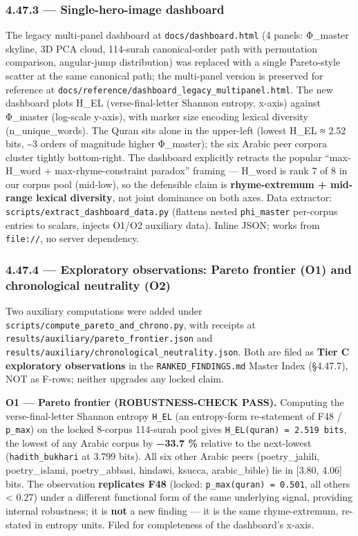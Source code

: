 \documentclass[
]{article}
\begin{document}
\subsubsection{4.47.3 --- Single-hero-image
dashboard}\label{single-hero-image-dashboard}

The legacy multi-panel dashboard at \texttt{docs/dashboard.html} (4
panels: Φ\_master skyline, 3D PCA cloud, 114-surah canonical-order path
with permutation comparison, angular-jump distribution) was replaced
with a single Pareto-style scatter at the same canonical path; the
multi-panel version is preserved for reference at
\texttt{docs/reference/dashboard\_legacy\_multipanel.html}. The new
dashboard plots H\_EL (verse-final-letter Shannon entropy, x-axis)
against Φ\_master (log-scale y-axis), with marker size encoding lexical
diversity (n\_unique\_words). The Quran sits alone in the upper-left
(lowest H\_EL ≈ 2.52 bits, \textasciitilde3 orders of magnitude higher
Φ\_master); the six Arabic peer corpora cluster tightly bottom-right.
The dashboard explicitly retracts the popular ``max-H\_word +
max-rhyme-constraint paradox'' framing --- H\_word is rank 7 of 8 in our
corpus pool (mid-low), so the defensible claim is \textbf{rhyme-extremum
+ mid-range lexical diversity}, not joint dominance on both axes. Data
extractor: \texttt{scripts/extract\_dashboard\_data.py} (flattens nested
\texttt{phi\_master} per-corpus entries to scalars, injects O1/O2
auxiliary data). Inline JSON; works from \texttt{file://}, no server
dependency.

\subsubsection{4.47.4 --- Exploratory observations: Pareto frontier (O1)
and chronological neutrality
(O2)}\label{exploratory-observations-pareto-frontier-o1-and-chronological-neutrality-o2}

Two auxiliary computations were added under
\texttt{scripts/compute\_pareto\_and\_chrono.py}, with receipts at
\texttt{results/auxiliary/pareto\_frontier.json} and
\texttt{results/auxiliary/chronological\_neutrality.json}. Both are
filed as \textbf{Tier C exploratory observations} in the
\texttt{RANKED\_FINDINGS.md} Master Index (§4.47.7), NOT as F-rows;
neither upgrades any locked claim.

\textbf{O1 --- Pareto frontier (ROBUSTNESS-CHECK PASS).} Computing the
verse-final-letter Shannon entropy \texttt{H\_EL} (an entropy-form
re-statement of F48 / \texttt{p\_max}) on the locked 8-corpus 114-surah
pool gives \texttt{H\_EL(quran)\ =\ 2.519\ bits}, the lowest of any
Arabic corpus by \textbf{−33.7 \%} relative to the next-lowest
(\texttt{hadith\_bukhari} at 3.799 bits). All six other Arabic peers
(poetry\_jahili, poetry\_islami, poetry\_abbasi, hindawi, ksucca,
arabic\_bible) lie in {[}3.80, 4.06{]} bits. The observation
\textbf{replicates F48} (locked: \texttt{p\_max(quran)\ =\ 0.501}, all
others \textless{} 0.27) under a different functional form of the same
underlying signal, providing internal robustness; it is \textbf{not} a
new finding --- it is the same rhyme-extremum, re-stated in entropy
units. Filed for completeness of the dashboard's x-axis.
\end{document}
